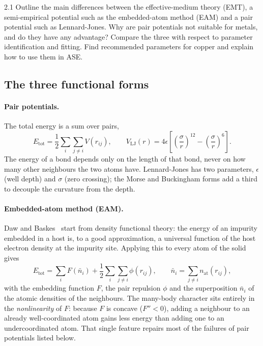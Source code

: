 \documentclass[11pt,a4paper]{article}
\numberwithin{equation}{section}
\theoremstyle{remark}
\begin{document}
\begin{task}{2.1}
  Outline the main differences between the effective-medium theory (EMT), a semi-empirical potential
  such as the embedded-atom method (EAM) and a pair potential such as Lennard-Jones. Why are pair
  potentials not suitable for metals, and do they have any advantage? Compare the three with respect
  to parameter identification and fitting. Find recommended parameters for copper and explain how to
  use them in ASE.
\end{task}

\subsection{The three functional forms}\label{sec:forms}

\paragraph{Pair potentials.}
The total energy is a sum over pairs,
\begin{equation}\label{eq:pair}
  E_{\mathrm{tot}} = \frac{1}{2}\sum_{i}\sum_{j\neq i} V(r_{ij}),
  \qquad
  V_{\mathrm{LJ}}(r) = 4\epsilon\left[\left(\frac{\sigma}{r}\right)^{12}
    - \left(\frac{\sigma}{r}\right)^{6}\right].
\end{equation}
The energy of a bond depends only on the length of that bond, never on how many other neighbours the
two atoms have. Lennard-Jones has two parameters, $\epsilon$ (well depth) and $\sigma$ (zero
crossing); the Morse and Buckingham forms add a third to decouple the curvature from the depth.

\paragraph{Embedded-atom method (EAM).}
Daw and Baskes~\citep{daw1984} start from density functional theory: the energy of an impurity
embedded in a host is, to a good approximation, a universal function of the host electron density at
the impurity site. Applying this to every atom of the solid gives
\begin{equation}\label{eq:eam}
  E_{\mathrm{tot}} = \sum_i F\!\left(\bar{n}_i\right) + \frac{1}{2}\sum_i\sum_{j\neq i}\phi(r_{ij}),
  \qquad
  \bar{n}_i = \sum_{j\neq i}n_{\mathrm{at}}(r_{ij}),
\end{equation}
with the embedding function $F$, the pair repulsion $\phi$ and the superposition $\bar n_i$ of the
atomic densities of the neighbours. The many-body character sits entirely in the \emph{nonlinearity}
of $F$: because $F$ is concave ($F'' < 0$), adding a neighbour to an already well-coordinated atom
gains less energy than adding one to an undercoordinated atom. That single feature repairs most of the
failures of pair potentials listed below.
\end{document}
